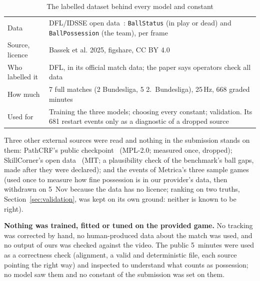 \documentclass[conference,a4paper]{IEEEtran}
\newcommand{\code}[1]{\texttt{#1}}
\begin{document}
\begin{table}[t]
\caption{The labelled dataset behind every model and constant}
\label{tab:data}
\centering
\footnotesize
\begin{tabularx}{\columnwidth}{@{}p{19mm}L@{}}
\toprule
Data & DFL/IDSSE open data~\cite{bassek2025}: \code{BallStatus} (in play or dead) and \code{BallPossession} (the
  team), per frame \\
Source, licence & Bassek et al. 2025, figshare, CC BY 4.0 \\
Who labelled it & DFL, in its official match data; the paper says operators check all data \\
How much & 7 full matches (2 Bundesliga, 5 2.~Bundesliga), 25\,Hz, 668 graded minutes \\
Used for & Training the three models; choosing every constant; validation. Its 681 restart events only as a
  diagnostic of a dropped source \\
\bottomrule
\end{tabularx}
\end{table}

Three other external sources were read and nothing in the submission stands on them: PathCRF's public
checkpoint~\cite{kim2026} (MPL-2.0; measured once, dropped); SkillCorner's open data~\cite{skillcorner} (MIT; a
plausibility check of the benchmark's ball gaps, made after they were declared); and the events of Metrica's three
sample games~\cite{metrica} (used once to measure how fine possession is in our provider's data, then withdrawn on
5~Nov because the data has no licence; ranking on two truths, Section~\ref{sec:validation}, was kept on its own
ground: neither is known to be right).

\textbf{Nothing was trained, fitted or tuned on the provided game.} No tracking was corrected by hand, no
human-produced data about the match was used, and no output of ours was checked against the video. The public
5~minutes were used as a correctness check (alignment, a valid and deterministic file, each source pointing the
right way) and inspected to understand what counts as possession; no model saw them and no constant of the
submission was set on them.
\end{document}
